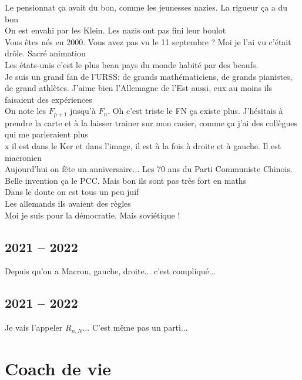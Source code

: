 \documentclass[french, a4paper, openany]{book}
\begin{document}
	\noindent \og Le pensionnat ça avait du bon, comme les jeunesses nazies. La rigueur ça a du bon \fg \\
	\og On est envahi par les Klein. Les nazis ont pas fini leur boulot \fg \\
	\og Vous êtes nés en 2000. Vous avez pas vu le 11 septembre ? Moi je l'ai vu c'était drôle. Sacré animation \fg \\
	\og Les états-unis c'est le plus beau pays du monde habité par des beaufs. \fg \\
	\og Je suis un grand fan de l'URSS: de grands mathématiciens, de grands pianistes, de grand athlètes. J'aime bien l'Allemagne de l'Est aussi, eux au moins ils faisaient des expériences \fg \\
	\og On note les $F_{p+1}$ jusqu'à $F_n$. Oh c'est triste le FN ça existe plus. J'hésitais à prendre la carte et à la laisser trainer sur mon casier, comme ça j'ai des collègues qui me parleraient plus \fg \\
	\og x il est dans le Ker et dans l'image, il est à la fois à droite et à gauche. Il est macronien \fg \\
	\og Aujourd'hui on fête un anniversaire... Les 70 ans du Parti Communiste Chinois. Belle invention ça le PCC. Mais bon ils sont pas très fort en maths \fg \\
	\og Dans le doute on est tous un peu juif \fg \\
	\og Les allemands ils avaient des règles \fg \\
	\og Moi je suis pour la démocratie. Mais soviétique ! \fg \\

\section{2021 -- 2022}
	
	\og Depuis qu'on a Macron, gauche, droite... c'est compliqué... \fg \\

\section{2021 -- 2022}

	\noindent \og Je vais l'appeler $R_{n,N}$... C'est même pas un parti... \fg \\

\chapter{Coach de vie}
\end{document}
